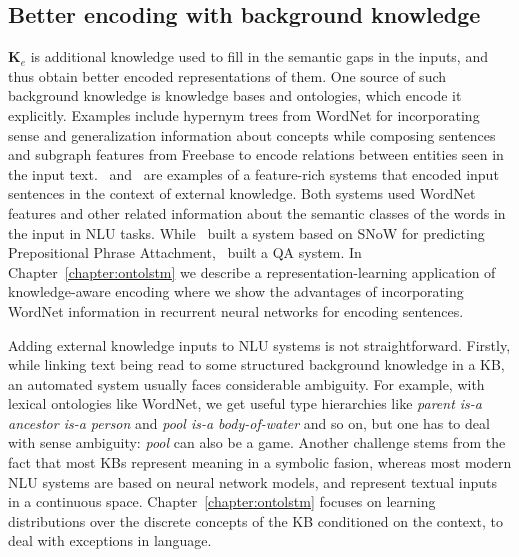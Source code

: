 \subsection{Better encoding with background knowledge}
$\mathbf{K}_e$ is additional knowledge used to fill in the semantic gaps in the inputs, and thus obtain better
encoded representations of them. One source of such background knowledge is knowledge bases and ontologies, which encode
it explicitly. Examples include hypernym trees from WordNet for incorporating sense and generalization information about
concepts while composing sentences and subgraph features from Freebase to encode relations
between entities seen in the input text.~\cite{moldovan2001logic} and~\cite{krymolowski1998incorporating} are examples of a feature-rich systems that encoded input sentences in the 
context of external knowledge. Both systems used WordNet features and other related information about the semantic classes of the words in the input in NLU tasks. While~\cite{krymolowski1998incorporating} 
built a system based on SNoW \citep{CCRR99} for predicting Prepositional Phrase Attachment,~\cite{moldovan2001logic} built a QA system. In Chapter~\ref{chapter:ontolstm} we describe
a representation-learning application of knowledge-aware encoding where we show the advantages of incorporating WordNet information in recurrent neural networks for encoding sentences.

Adding external knowledge inputs to NLU systems is not straightforward. Firstly, while linking text being read to some structured background knowledge
in a KB, an automated system usually faces considerable ambiguity. For example, with lexical ontologies like WordNet, 
we get useful type hierarchies like \textit{parent is-a ancestor is-a person} and \textit{pool is-a body-of-water} 
and so on, but one has to deal with sense ambiguity: \textit{pool} can also be a game. Another challenge stems from the fact that most KBs represent meaning in a symbolic fasion,
whereas most modern NLU systems are based on neural network models, and represent textual inputs in a continuous space. Chapter~\ref{chapter:ontolstm} focuses on learning 
distributions over the discrete concepts of the KB conditioned on the context, to deal with exceptions in language.

